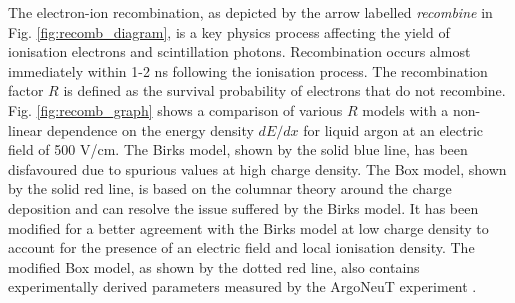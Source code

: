 The electron-ion recombination, as depicted by the arrow labelled \textit{recombine} in Fig. \ref{fig:recomb_diagram}, is a key physics process affecting the yield of ionisation electrons and scintillation photons.
Recombination occurs almost immediately within 1-2 ns following the ionisation process.                                                                                                                
The recombination factor $R$ is defined as the survival probability of electrons that do not recombine.
Fig. \ref{fig:recomb_graph} shows a comparison of various $R$ models with a non-linear dependence on the energy density $dE/dx$ for liquid argon at an electric field of 500 V/cm.
The Birks model, shown by the solid blue line, has been disfavoured due to spurious values at high charge density.
The Box model, shown by the solid red line, is based on the columnar theory around the charge deposition and can resolve the issue suffered by the Birks model.
It has been modified for a better agreement with the Birks model at low charge density to account for the presence of an electric field and local ionisation density.
The modified Box model, as shown by the dotted red line, also contains experimentally derived parameters measured by the ArgoNeuT experiment \cite{argoneut_recomb}.



